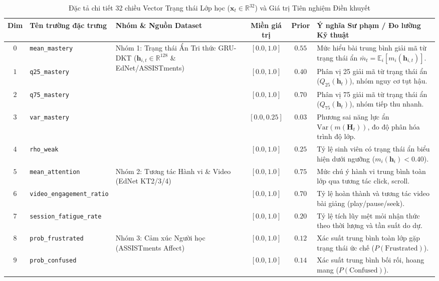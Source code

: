 \begin{table}[htbp]
  \centering\scriptsize
  \caption{Đặc tả chi tiết 32 chiều Vector Trạng thái Lớp học ($\mathbf{x}_t \in \mathbb{R}^{32}$) và Giá trị Tiên nghiệm Điền khuyết}\label{tab:state-32d-full}
  \begin{tabularx}{\textwidth}{c p{3.6cm} p{3.2cm} c c X}
    \toprule
    \textbf{Dim} & \textbf{Tên trường đặc trưng} & \textbf{Nhóm \& Nguồn Dataset} & \textbf{Miền giá trị} & \textbf{Prior} & \textbf{Ý nghĩa Sư phạm / Đo lường Kỹ thuật} \\
    \midrule
    $0$ & \texttt{mean\_mastery} & \multirow{5}{3.2cm}{Nhóm 1: Trạng thái Ẩn Tri thức GRU-DKT ($\mathbf{h}_{i, t} \in \mathbb{R}^{128}$ \& EdNet/ASSISTments)} & $[0.0, 1.0]$ & $0.55$ & Mức hiểu bài trung bình giải mã từ trạng thái ẩn $\bar{m}_t = \mathbb{E}_i[m_i(\mathbf{h}_{i, t})]$. \\
    $1$ & \texttt{q25\_mastery} & & $[0.0, 1.0]$ & $0.40$ & Phân vị 25 giải mã từ trạng thái ẩn ($Q_{25}(\mathbf{h}_t)$), nhóm nguy cơ tụt hậu. \\
    $2$ & \texttt{q75\_mastery} & & $[0.0, 1.0]$ & $0.70$ & Phân vị 75 giải mã từ trạng thái ẩn ($Q_{75}(\mathbf{h}_t)$), nhóm tiếp thu nhanh. \\
    $3$ & \texttt{var\_mastery} & & $[0.0, 0.25]$ & $0.03$ & Phương sai năng lực ẩn $\text{Var}(m(\mathbf{H}_t))$, đo độ phân hóa trình độ lớp. \\
    $4$ & \texttt{rho\_weak} & & $[0.0, 1.0]$ & $0.25$ & Tỷ lệ sinh viên có trạng thái ẩn biểu hiện dưới ngưỡng ($m_i(\mathbf{h}_i) < 0.40$). \\
    \midrule
    $5$ & \texttt{mean\_attention} & \multirow{3}{3.2cm}{Nhóm 2: Tương tác Hành vi \& Video (EdNet KT2/3/4)} & $[0.0, 1.0]$ & $0.75$ & Mức chú ý hành vi trung bình toàn lớp qua tương tác click, scroll. \\
    $6$ & \texttt{video\_engagement\_ratio} & & $[0.0, 1.0]$ & $0.70$ & Tỷ lệ hoàn thành và tương tác video bài giảng (play/pause/seek). \\
    $7$ & \texttt{session\_fatigue\_rate} & & $[0.0, 1.0]$ & $0.20$ & Tỷ lệ tích lũy mệt mỏi nhận thức theo thời lượng và tần suất do dự. \\
    \midrule
    $8$ & \texttt{prob\_frustrated} & \multirow{4}{3.2cm}{Nhóm 3: Cảm xúc Người học (ASSISTments Affect)} & $[0.0, 1.0]$ & $0.12$ & Xác suất trung bình toàn lớp gặp trạng thái ức chế ($P(\text{Frustrated})$). \\
    $9$ & \texttt{prob\_confused} & & $[0.0, 1.0]$ & $0.14$ & Xác suất trung bình bối rối, hoang mang ($P(\text{Confused})$). \\

\end{tabularx}
\end{table}

